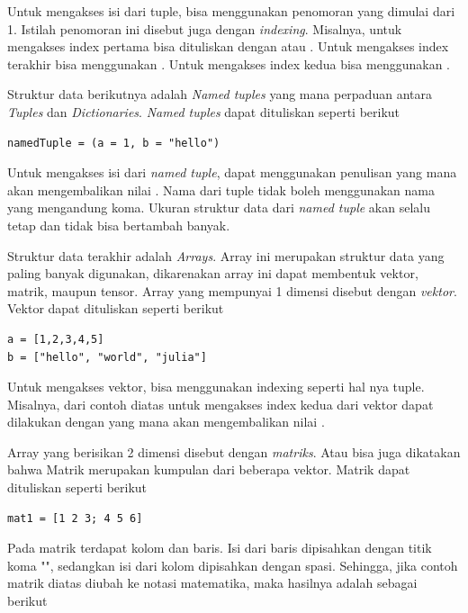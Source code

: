 \noindent
Untuk mengakses isi dari tuple, bisa menggunakan penomoran yang dimulai dari 1. Istilah
penomoran ini disebut juga dengan \emph{indexing}. Misalnya, untuk mengakses
index pertama bisa dituliskan dengan  atau . Untuk mengakses
index terakhir bisa menggunakan . Untuk mengakses index kedua bisa menggunakan
.

Struktur data berikutnya adalah \emph{Named tuples} yang mana perpaduan antara \emph{Tuples}
dan \emph{Dictionaries}. \emph{Named tuples} dapat dituliskan seperti berikut

\begin{lstlisting}
namedTuple = (a = 1, b = "hello")
\end{lstlisting}

\noindent
Untuk mengakses isi dari \emph{named tuple}, dapat menggunakan penulisan 
yang mana akan mengembalikan nilai . Nama dari tuple tidak boleh
menggunakan nama yang mengandung koma. Ukuran struktur data dari \emph{named
tuple} akan selalu tetap dan tidak bisa bertambah banyak.

Struktur data terakhir adalah \emph{Arrays}. Array ini merupakan struktur data
yang paling banyak digunakan, dikarenakan array ini dapat membentuk vektor,
matrik, maupun tensor. Array yang mempunyai 1 dimensi disebut dengan \emph{vektor}.
Vektor dapat dituliskan seperti berikut

\begin{lstlisting}
a = [1,2,3,4,5]
b = ["hello", "world", "julia"]
\end{lstlisting}

\noindent
Untuk mengakses vektor, bisa menggunakan indexing seperti hal nya tuple.
Misalnya, dari contoh diatas untuk mengakses index kedua dari vektor 
dapat dilakukan dengan  yang mana akan mengembalikan nilai .

Array yang berisikan 2 dimensi disebut dengan \emph{matriks}. Atau bisa juga
dikatakan bahwa Matrik merupakan kumpulan dari beberapa vektor. Matrik dapat dituliskan
seperti berikut

\begin{lstlisting}
mat1 = [1 2 3; 4 5 6]
\end{lstlisting}

\noindent
Pada matrik terdapat kolom dan baris. Isi dari baris dipisahkan dengan titik
koma "\cw{;}", sedangkan isi dari kolom dipisahkan dengan spasi. Sehingga, jika
contoh matrik diatas diubah ke notasi matematika, maka hasilnya adalah sebagai berikut

